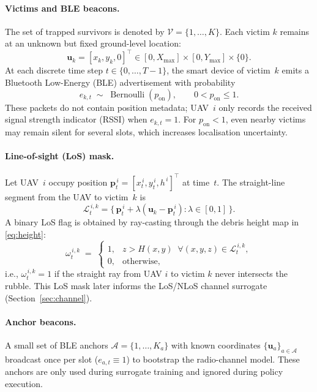 \documentclass[drones,article,accept,pdftex,moreauthors]{Definitions/mdpi}
\begin{document}
\paragraph{Victims and BLE beacons.}
The set of trapped survivors is denoted by $\mathcal V = \{1,\dots,K\}$. Each victim \(k\)
remains at an unknown but fixed ground-level location:
\begin{equation}
\mathbf u_k = [x_k, y_k, 0]^{\top} \in [0,X_{\max}]\times[0,Y_{\max}]\times\{0\}.
\label{eq:victpos}
\end{equation}
At each discrete time step \(t \in \{0,\dots,T{-}1\}\), the smart device of victim~$k$
emits a Bluetooth Low-Energy (BLE) advertisement with probability
\begin{equation}
e_{k,t} \;\sim\; \operatorname{Bernoulli}(p_{\mathrm{on}}),
\qquad 0 < p_{\mathrm{on}} \le 1.
\label{eq:bern}
\end{equation}
These packets do not contain position metadata; UAV~$i$ only records the received
signal strength indicator (RSSI) when \(e_{k,t} = 1\). For $p_{\mathrm{on}}<1$, even nearby
victims may remain silent for several slots, which increases localisation uncertainty.

\paragraph{Line-of-sight (LoS) mask.}
Let UAV~$i$ occupy position $\mathbf p_t^{\,i} = [x_t^{\,i}, y_t^{\,i}, h^{\,i}]^{\top}$ at time~$t$.
The straight-line segment from the UAV to victim~$k$ is
\begin{equation}
\mathcal L_t^{\,i,k} = \bigl\{\,
\mathbf p_t^{\,i} + \lambda(\mathbf u_k - \mathbf p_t^{\,i})
: \lambda \in [0,1] \,\bigr\}.
\end{equation}
A binary LoS flag is obtained by ray-casting through the debris height map in
\eqref{eq:height}:
\begin{equation}
\omega_t^{\,i,k} \;=\;
\begin{cases}
1, & z > H(x,y) \;\;\forall (x,y,z)\in \mathcal L_t^{\,i,k},\\[4pt]
0, & \text{otherwise},
\end{cases}
\label{eq:losflag}
\end{equation}
i.e., $\omega_t^{\,i,k}=1$ if the straight ray from UAV $i$ to victim $k$ never intersects
the rubble. This LoS mask later informs the LoS/NLoS channel surrogate
(Section~\ref{sec:channel}).

\paragraph{Anchor beacons.}
A small set of BLE anchors $\mathcal A = \{1,\dots,K_a\}$ with known coordinates
$\{\mathbf u_a\}_{a \in \mathcal A}$ broadcast once per slot (\(e_{a,t} \equiv 1\)) to bootstrap
the radio-channel model. These anchors are only used during surrogate training and
ignored during policy execution.
\end{document}
